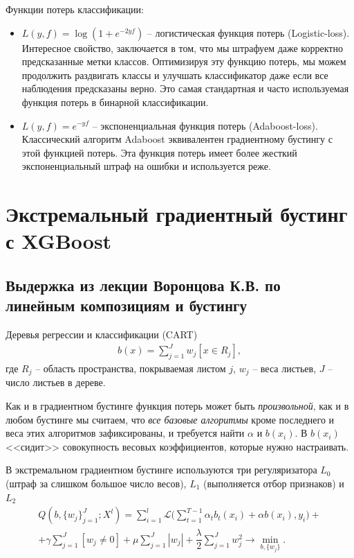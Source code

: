 \documentclass[%
	11pt,
	a4paper,
	utf8,
		]{article}
\begin{document}
Функции потерь классификации:
\begin{itemize}
	\item $ L(y, f) = \log(1 + e^{-2 y f}) $ -- логистическая функция потерь (Logistic-loss). Интересное свойство, заключается в том, что мы штрафуем даже корректно предсказанные метки классов. Оптимизируя эту функцию потерь, мы можем продолжить раздвигать классы и улучшать классификатор даже если все наблюдения предсказаны верно. Это самая стандартная и часто используемая функция потерь в бинарной классификации.
	
	\item $ L(y, f) = e^{-yf} $ -- экспоненциальная функция потерь (Adaboost-loss). Классический алгоритм Adaboost эквивалентен градиентному бустингу с этой функцией потерь. Эта функция потерь имеет более жесткий экспоненциальный штраф на ошибки и используется реже.
\end{itemize}




\section{Экстремальный градиентный бустинг с XGBoost}

\subsection{Выдержка из лекции Воронцова К.В. по линейным композициям и бустингу}

Деревья регрессии и классификации (CART)
\begin{align*}
	b(x) = \sum_{j=1}^{J} w_j[x \in R_j],
\end{align*}
где $ R_j $ -- область пространства, покрываемая листом $ j $, $ w_j $ -- веса листьев, $ J $ -- число листьев в дереве.

Как и в градиентном бустинге функция потерь может быть \emph{произвольной}, как и в любом бустинге мы считаем, что \emph{все базовые алгоритмы} кроме последнего и веса этих алгоритмов зафиксированы, и требуется найти $ \alpha $ и $ b(x_i) $. В $ b(x_i) $ <<сидит>> совокупность весовых коэффициентов, которые нужно настраивать.

В экстремальном градиентном бустинге используются три регуляризатора $ L_0 $ (штраф за слишком большое число весов), $ L_1 $ (выполняется отбор признаков) и $ L_2 $
\begin{multline*}
	Q(b, \{w_j\}_{j=1}^J; X^l) = \sum_{i=1}^{l} \mathcal{L} \Big( \sum_{t=1}^{T-1} \alpha_t b_t(x_i) + \alpha b(x_i), y_i \Big) + \\
	+ \gamma \sum_{j=1}^{J} [w_j \neq 0] + \mu \sum_{j=1}^{J} |w_j| + \dfrac{\lambda}{2} \sum_{j=1}^{J} w_j^2 \to \underset{b, \{w_j\}}{\min}.
\end{multline*}
\end{document}
